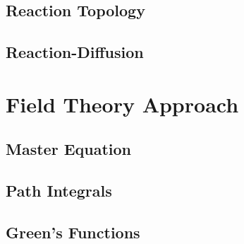 \documentclass{article}[12pt]
\numberwithin{equation}{section}
\begin{document}
\subsection{Reaction Topology}

\subsection{Reaction-Diffusion}

\section{Field Theory Approach}
\subsection{Master Equation}

\subsection{Path Integrals}

\subsection{Green's Functions}


\end{document}
